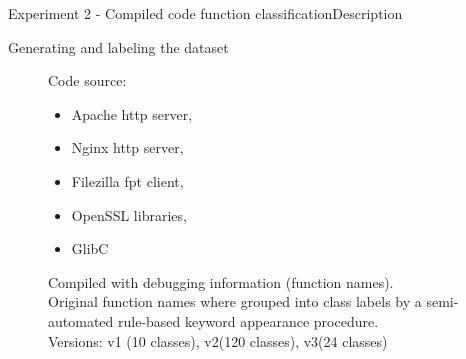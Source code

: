 \documentclass[xcolor=table]{beamer}
\begin{document}
\begin{frame}{Experiment 2 - Compiled code function classification}{Description}

Generating and labeling the dataset



\begin{figure}[H]

Code source:
\begin{itemize}
    \item Apache http server,
    \item Nginx http server,
    \item Filezilla fpt client,
    \item OpenSSL libraries,
    \item GlibC
\end{itemize}
\endminipage
\hfill
{}%
Compiled with debugging information (function names).\\

Original function names where grouped into class labels by a semi-automated rule-based keyword appearance procedure.
\\

Versions: v1 (10 classes), v2(120 classes), v3(24 classes)

\endminipage
\end{figure}







\end{frame}
\end{document}

